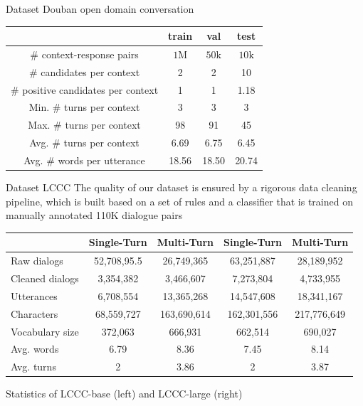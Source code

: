 \documentclass{beamer}
\begin{document}
\begin{frame}{Dataset Douban}
 open domain conversation
 
 \begin{tabular}{c|c|c|c}
\hline & train & val & test \\
\hline # context-response pairs & $1 \mathrm{M}$ & $50 \mathrm{k}$ & $10 \mathrm{k}$ \\
\hline # candidates per context & 2 & 2 & 10 \\
\hline # positive candidates per context & 1 & 1 & 1.18 \\
\hline Min. # turns per context & 3 & 3 & 3 \\
\hline Max. # turns per context & 98 & 91 & 45 \\
\hline Avg. # turns per context & 6.69 & 6.75 & 6.45 \\
\hline Avg. # words per utterance & 18.56 & 18.50 & 20.74 \\
\hline
\end{tabular}

\end{frame}

\begin{frame}{Dataset LCCC}
 The quality of our dataset is ensured by a rigorous data cleaning pipeline, which
is built based on a set of rules and a classifier that is trained on manually annotated 110K dialogue pairs
    \begin{center}\footnotesize
        \begin{tabular}{l|c|c|c|c} 
\hline & Single-Turn & Multi-Turn & Single-Turn& Multi-Turn \\
\hline Raw dialogs & 52,708,95.5 & 26,749,365 & 63,251,887 & 28,189,952 \\
Cleaned dialogs & 3,354,382 & 3,466,607 & 7,273,804 & 4,733,955 \\
Utterances & 6,708,554 & 13,365,268 & 14,547,608 & 18,341,167 \\
Characters & 68,559,727 & 163,690,614 & 162,301,556 & 217,776,649 \\
Vocabulary size & 372,063 & 666,931 & 662,514 & 690,027 \\
Avg. words & 6.79 & 8.36 & 7.45 & 8.14 \\
Avg. turns & 2 & 3.86 & 2 & 3.87 \\
\hline
\end{tabular}
Statistics of LCCC-base (left) and LCCC-large (right)
    \end{center}
    
\end{frame}
\end{document}
